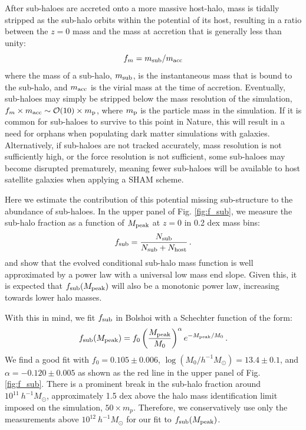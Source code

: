 \documentclass[useAMS,fleqn,usenatbib]{mnras}
\begin{document}
After sub-haloes are accreted onto a more massive host-halo, mass is tidally stripped as the sub-halo orbits within the potential of its host, resulting in a ratio between the $z=0$ mass and the mass at accretion that is generally less than unity:
%
\begin{equation}
f_m = m_{\rm sub}/m_{\rm acc}
\end{equation}
%
where the mass of a sub-halo, $m_{\rm sub}$, is the instantaneous mass that is bound to the sub-halo, and $m_{\rm acc}$ is the virial mass at the time of accretion.  Eventually, sub-haloes may simply be stripped below the mass resolution of the simulation, $f_m \times m_{\rm acc} \sim \mathcal{O}(10) \times m_{\rm p}$, where $m_{\rm p}$ is the particle mass in the simulation. If it is common for sub-haloes to survive to this point in Nature, this will result in a need for orphans when populating dark matter simulations with galaxies. Alternatively, if sub-haloes are not tracked accurately, mass resolution is not sufficiently high, or the force resolution is not sufficient, some sub-haloes may become disrupted prematurely, meaning fewer sub-haloes will be available to host satellite galaxies when applying a SHAM scheme.

Here we estimate the contribution of this potential missing sub-structure to the abundance of sub-haloes.  In the upper panel of Fig. \ref{fig:f_sub}, we measure the sub-halo fraction as a function of $M_{\rm peak}$ at $z=0$ in 0.2 dex mass bins:
%
\begin{equation}
\label{eq:fsub}
f_{\rm sub}= \frac{N_{\rm sub}}{N_{\rm sub}+N_{\rm host}}\,.
\end{equation}
%
\cite{Jiang:2016dw} and \cite{vandenBosch:2016ky} show that the evolved conditional sub-halo mass function is well approximated by a power law with a universal low mass end slope.  Given this, it is expected that $f_{\rm sub}(M_{\rm peak})$ will also be a monotonic power law, increasing towards lower halo masses.

With this in mind, we fit $f_{\rm sub}$ in Bolshoi with a Schechter function of the form:
%
\begin{equation}
\label{eq:fsub_fit}
f_{\rm sub}(M_{\rm peak}) = f_0 \left( \frac{M_{\rm peak}}{M_0} \right)^{\alpha}e^{-M_{\rm peak}/M_0}\,.
\end{equation}
%
We find a good fit with $f_0 = 0.105 \pm 0.006$, $\log(M_0/h^{-1}M_{\odot}) = 13.4 \pm 0.1$, and $\alpha = -0.120 \pm 0.005$ as shown as the red line in the upper panel of Fig. \ref{fig:f_sub}.  There is a prominent break in the sub-halo fraction around $10^{11} ~ h^{-1}M_{\odot}$, approximately 1.5 dex above the halo mass identification limit imposed on the simulation, $50 \times m_{p}$.  Therefore, we conservatively use only the measurements above $10^{12}~h^{-1}M_{\odot}$ for our fit to $f_{\rm sub}(M_{\rm peak})$. 
\end{document}
